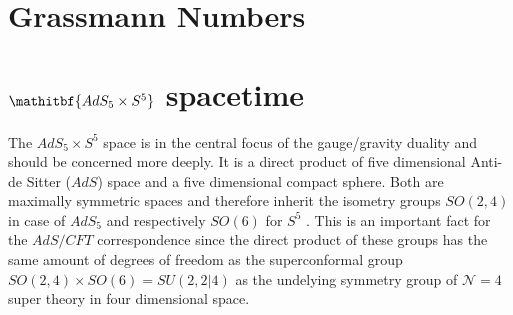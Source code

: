 %
%
%
%
%
\section{Grassmann Numbers}

%
%
%
%
%
\section[$AdS_{5}\times S^{5}$ spacetime]{$\mathitbf{AdS_{5}\times S^{5}}$ spacetime}
The $AdS_{5}\times S^{5}$ space is in the central focus of the gauge/gravity duality and should be concerned more deeply. It is a direct product of five dimensional Anti-de Sitter ($AdS$) space and a five dimensional compact sphere. Both are maximally symmetric spaces and therefore inherit the isometry groups $SO(2,4)$ in case of $AdS_{5}$ and respectively $SO(6)$ for $S^{5}$ \cite{Ammon:2015wua}. This is an important fact for the $AdS/CFT$ correspondence since the direct product of these groups has the same amount of degrees of freedom as the superconformal group $SO(2,4)\times SO(6) = SU(2,2\vert 4)$ as the undelying symmetry group of $\mathcal{N}=4$ super  theory in four dimensional  space.
%
%
